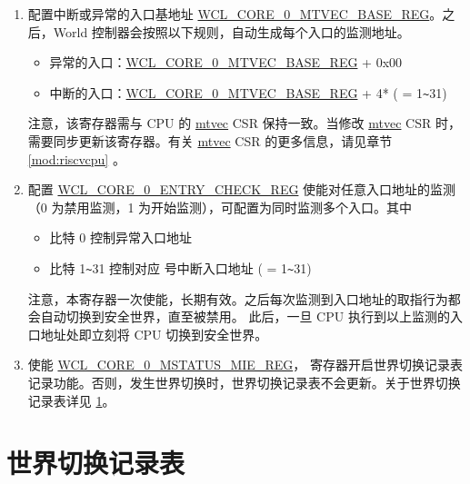 \documentclass[main\_\_CN.tex]{subfiles}
\begin{document}
\begin{enumerate}
    \item 配置中断或异常的入口基地址 \hyperref[regdesc:WCLCORE0MTVECBASEREG]{WCL\_CORE\_0\_MTVEC\_BASE\_REG}。之后，World 控制器会按照以下规则，自动生成每个入口的监测地址。
    \begin{itemize}
    \item 异常的入口：\hyperref[regdesc:WCLCORE0MTVECBASEREG]{WCL\_CORE\_0\_MTVEC\_BASE\_REG} + 0x00
    \item 中断的入口：\hyperref[regdesc:WCLCORE0MTVECBASEREG]{WCL\_CORE\_0\_MTVEC\_BASE\_REG} + 4*  ( = 1\verb+~+31)
    \end{itemize}
    注意，该寄存器需与 CPU 的 \hyperref[regdesc:MTVEC]{mtvec} CSR 保持一致。当修改 \hyperref[regdesc:MTVEC]{mtvec} CSR 时，需要同步更新该寄存器。有关 \hyperref[regdesc:MTVEC]{mtvec} CSR 的更多信息，请见章节 \ref{mod:riscvcpu} \textit{}。
    \item 配置 \hyperref[regdesc:WCLCORE0ENTRYCHECKREG]{WCL\_CORE\_0\_ENTRY\_CHECK\_REG} 使能对任意入口地址的监测（0 为禁用监测，1 为开始监测），可配置为同时监测多个入口。其中
    \begin{itemize}
        \item 比特 0 控制异常入口地址
        \item 比特 1\verb+~+31 控制对应  号中断入口地址 ( = 1\verb+~+31)
    \end{itemize}
    注意，本寄存器一次使能，长期有效。之后每次监测到入口地址的取指行为都会自动切换到安全世界，直至被禁用。
    此后，一旦 CPU 执行到以上监测的入口地址处即立刻将 CPU 切换到安全世界。
    \item 使能 \hyperref[regdesc:WCLCORE0MSTATUSMIEREG]{WCL\_CORE\_0\_MSTATUS\_MIE\_REG}， 寄存器开启世界切换记录表记录功能。否则，发生世界切换时，世界切换记录表不会更新。关于世界切换记录表详见 \ref{subsub:world_switch_table}。
\end{enumerate}

























\section{世界切换记录表} \label{subsub:world_switch_table}
\end{document}

